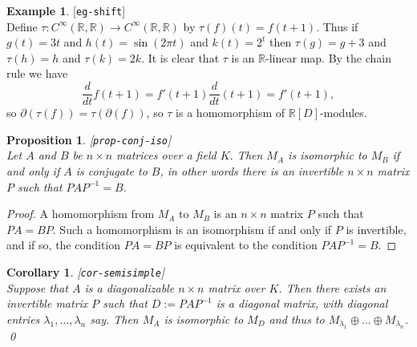 \documentclass{amsart}
\newcommand{\lbl}[1]{\label{#1}\textup{[\texttt{#1}]}\ \\}
\newcommand{\lbl}{\label}
\newcommand{\R}         {{\mathbb{R}}}
\newcommand{\lm}        {\lambda}
\newcommand{\tm}        {\times}
\newcommand{\CRR}       {C^\infty(\R,\R)}
\newcommand{\xra}       {\xrightarrow}
\newcommand{\op}        {\oplus}
\renewcommand{\:}{\colon}
\newtheorem{proposition}[theorem]{Proposition}
\newtheorem{corollary}[theorem]{Corollary}
\theoremstyle{definition}
\newtheorem{example}[theorem]{Example}
\begin{document}
\begin{example}\lbl{eg-shift}
 Define $\tau\:\CRR\xra{}\CRR$ by $\tau(f)(t)=f(t+1)$.  Thus if
 $g(t)=3t$ and $h(t)=\sin(2\pi t)$ and $k(t)=2^t$ then $\tau(g)=g+3$
 and $\tau(h)=h$ and $\tau(k)=2k$.  It is clear that $\tau$ is an
 $\R$-linear map.  By the chain rule we have
 \[ \frac{d}{dt} f(t+1) = f'(t+1) \frac{d}{dt}(t+1) = f'(t+1), \]
 so $\partial(\tau(f))=\tau(\partial(f))$, so $\tau$ is a homomorphism
 of $\R[D]$-modules.
\end{example}

\begin{proposition}\lbl{prop-conj-iso}
 Let $A$ and $B$ be $n\tm n$ matrices over a field $K$.  Then $M_A$ is
 isomorphic to $M_B$ if and only if $A$ is conjugate to $B$, in other
 words there is an invertible $n\tm n$ matrix $P$ such that
 $PAP^{-1}=B$.
\end{proposition}
\begin{proof}
 A homomorphism from $M_A$ to $M_B$ is an $n\tm n$ matrix $P$ such
 that $PA=BP$.  Such a homomorphism is an isomorphism if and only if
 $P$ is invertible, and if so, the condition $PA=BP$ is equivalent to
 the condition $PAP^{-1}=B$.
\end{proof}
\begin{corollary}\lbl{cor-semisimple}
 Suppose that $A$ is a diagonalizable $n\tm n$ matrix over $K$.  Then
 there exists an invertible matrix $P$ such that $D:=PAP^{-1}$ is a
 diagonal matrix, with diagonal entries $\lm_1,\ldots,\lm_n$ say.
 Then $M_A$ is isomorphic to $M_D$ and thus to
 $M_{\lm_1}\op\ldots\op M_{\lm_n}$. \qed
\end{corollary}
\end{document}
